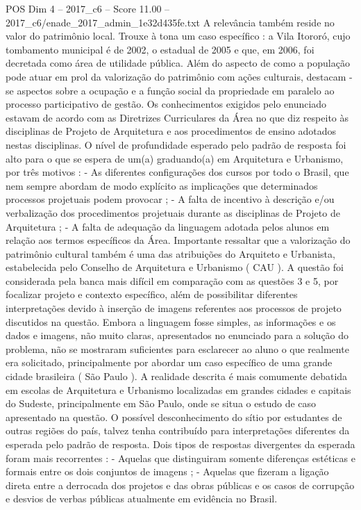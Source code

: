 \begin{textsample}{POS Dim 4 – 2017\_c6 – Score 11.00 – 2017\_c6/enade\_2017\_admin\_1e32d435fe.txt}
A relevância também reside no valor do patrimônio local.
Trouxe à tona um caso específico : a Vila Itororó, cujo tombamento municipal é de 2002, o estadual de 2005 e que, em 2006, foi decretada como área de utilidade pública.
Além do aspecto de como a população pode atuar em prol da valorização do patrimônio com ações culturais, destacam -se aspectos sobre a ocupação e a função social da propriedade em paralelo ao processo participativo de gestão.
Os conhecimentos exigidos pelo enunciado estavam de acordo com as Diretrizes Curriculares da Área no que diz respeito às disciplinas de Projeto de Arquitetura e aos procedimentos de ensino adotados nestas disciplinas.
O nível de profundidade esperado pelo padrão de resposta foi alto para o que se espera de um(a) graduando(a) em Arquitetura e Urbanismo, por três motivos : - As diferentes configurações dos cursos por todo o Brasil, que nem sempre abordam de modo explícito as implicações que determinados processos projetuais podem provocar ; - A falta de incentivo à descrição e/ou verbalização dos procedimentos projetuais durante as disciplinas de Projeto de Arquitetura ; - A falta de adequação da linguagem adotada pelos alunos em relação aos termos específicos da Área.
Importante ressaltar que a valorização do patrimônio cultural também é uma das atribuições do Arquiteto e Urbanista, estabelecida pelo Conselho de Arquitetura e Urbanismo ( CAU ).
A questão foi considerada pela banca mais difícil em comparação com as questões 3 e 5, por focalizar projeto e contexto específico, além de possibilitar diferentes interpretações devido à inserção de imagens referentes aos processos de projeto discutidos na questão.
Embora a linguagem fosse simples, as informações e os dados e imagens, não muito claras, apresentados no enunciado para a solução do problema, não se mostraram suficientes para esclarecer ao aluno o que realmente era solicitado, principalmente por abordar um caso específico de uma grande cidade brasileira ( São Paulo ).
A realidade descrita é mais comumente debatida em escolas de Arquitetura e Urbanismo localizadas em grandes cidades e capitais do Sudeste, principalmente em São Paulo, onde se situa o estudo de caso apresentado na questão.
O possível desconhecimento do sítio por estudantes de outras regiões do país, talvez tenha contribuído para interpretações diferentes da esperada pelo padrão de resposta.
Dois tipos de respostas divergentes da esperada foram mais recorrentes : - Aquelas que distinguiram somente diferenças estéticas e formais entre os dois conjuntos de imagens ; - Aquelas que fizeram a ligação direta entre a derrocada dos projetos e das obras públicas e os casos de corrupção e desvios de verbas públicas atualmente em evidência no Brasil.

\end{textsample}
